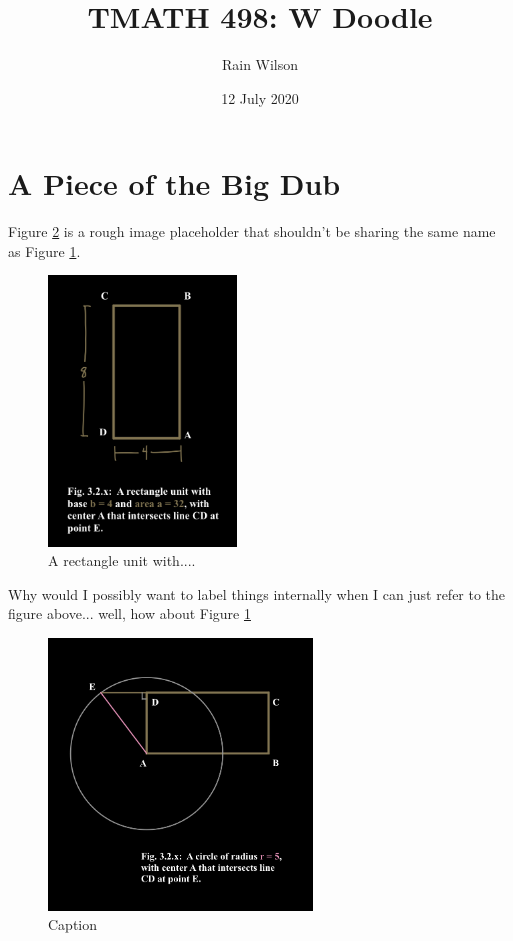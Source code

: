 \documentclass{article}
\title{TMATH 498: W Doodle}
\author{Rain Wilson}
\date{12 July 2020}
\begin{document}
\maketitle

\section{A Piece of the Big Dub}
Figure \ref{fig:my_label} is a rough image placeholder that shouldn't be sharing the same name as Figure \ref{figRect4by8}.
\newline %
\begin{figure}[h]
    \centering
    \includegraphics[width=5cm]{  Capstone Presentation/IMG_0004.jpeg}
    \caption{A rectangle unit with....} 
    \label{figRect4by8}
\end{figure}

Why would I possibly want to label things internally when I can just refer to the figure above... well, how about Figure \ref{figRect4by8}
\newline
\begin{figure}
    \centering
    \includegraphics[width=7cm]{Capstone Presentation/IMG_0005.jpeg}
    \caption{Caption}
    \label{fig:my_label}
\end{figure}
\\
\end{document}
